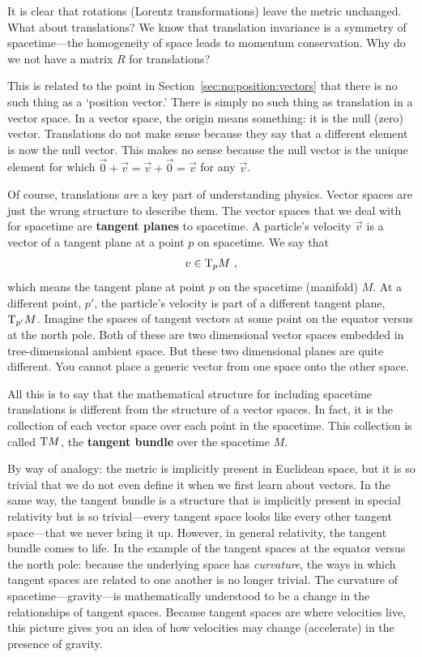 \begin{example}
It is clear that rotations (Lorentz transformations) leave the metric unchanged. What about translations? We know that translation invariance is a symmetry of spacetime---the homogeneity of space leads to momentum conservation. Why do we not have a matrix $R$ for translations?

This is related to the point in Section~\ref{sec:no:position:vectors} that there is no such thing as a `position vector.' There is simply no such thing as translation in a vector space. In a vector space, the origin means something: it is the null (zero) vector. Translations do not make sense because they say that a different element is now the null vector. This makes no sense because the null vector is the unique element for which $\vec{0}+\vec{v} = \vec{v} + \vec{0} = \vec{v}$ for any $\vec{v}$. 

Of course, translations \emph{are} a key part of understanding physics. Vector spaces are just the wrong structure to describe them. The vector spaces that we deal with for spacetime are \textbf{tangent planes} to spacetime. A particle's velocity $\vec{v}$ is a vector of a tangent plane at a point $p$ on spacetime. We say that
\begin{align}
    v\in \textnormal{T}_p{M} \ ,
\end{align}
which means the tangent plane at point $p$ on the spacetime (manifold) $M$. At a different point, $p'$, the particle's velocity is part of a different tangent plane, $\textnormal{T}_{p'}M$. Imagine the spaces of tangent vectors at some point on the equator versus at the north pole. Both of these are two dimensional vector spaces embedded in tree-dimensional ambient space. But these two dimensional planes are quite different. You cannot place a generic vector from one space onto the other space. 

All this is to say that the mathematical structure for including spacetime translations is different from the structure of a vector spaces. In fact, it is the collection of each vector space over each point in the spacetime. This collection is called $\textnormal{T}M$, the \textbf{tangent bundle} over the spacetime $M$. 

By way of analogy: the metric is implicitly present in Euclidean space, but it is so trivial that we do not even define it when we first learn about vectors. In the same way, the tangent bundle is a structure that is implicitly present in special relativity but is so trivial---every tangent space looks like every other tangent space---that we never bring it up. However, in general relativity, the tangent bundle comes to life. In the example of the tangent spaces at the equator versus the north pole: because the underlying space has \emph{curvature}, the ways in which tangent spaces are related to one another is no longer trivial. The curvature of spacetime---gravity---is mathematically understood to be a change in the relationships of tangent spaces. Because tangent spaces are where velocities live, this picture gives you an idea of how velocities may change (accelerate) in the presence of gravity.


\end{example}
